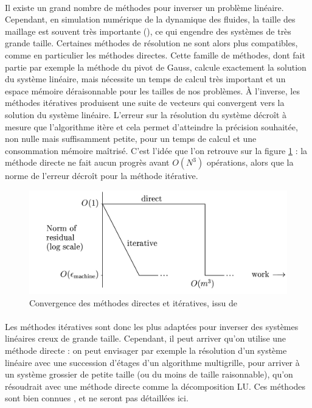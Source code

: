 		\paragraph{}
		Il existe un grand nombre de méthodes pour inverser un problème linéaire.
		Cependant, en simulation numérique de la dynamique des fluides, la taille des maillage est souvent très importante (), ce qui engendre des systèmes de très grande taille.
		Certaines méthodes de résolution ne sont alors plus compatibles, comme en particulier les méthodes directes.
		Cette famille de méthodes, dont fait partie par exemple la méthode du pivot de Gauss, calcule exactement la solution du système linéaire, mais nécessite un temps de calcul très important et un espace mémoire déraisonnable pour les tailles de nos problèmes.
		À l'inverse, les méthodes itératives produisent une suite de vecteurs qui convergent vers la solution du système linéaire.
		L'erreur sur la résolution du système décroît à mesure que l'algorithme itère et cela permet d'atteindre la précision souhaitée, non nulle mais suffisamment petite, pour un temps de calcul et une consommation mémoire maîtrisé.
		C'est l'idée que l'on retrouve sur la figure \ref{fig:direct-iterative} : la méthode directe ne fait aucun progrès avant $O\left(N^3\right)$ opérations, alors que la norme de l'erreur décroît pour la méthode itérative.

		\begin{figure}
			\centering
			\includegraphics[width=.7\textwidth]{images/direct-iterative.png}
			\caption{Convergence des méthodes directes et itératives, issu de \cite{TrefethenBau1997}}
			\label{fig:direct-iterative}
		\end{figure}

		\paragraph{}
		Les méthodes itératives sont donc les plus adaptées pour inverser des systèmes linéaires creux de grande taille.
		Cependant, il peut arriver qu'on utilise une méthode directe : on peut envisager par exemple la résolution d'un système linéaire avec une succession d'étages d'un algorithme multigrille, pour arriver à un système grossier de petite taille (ou du moins de taille raisonnable), qu'on résoudrait avec une méthode directe comme la décomposition LU.
		Ces méthodes sont bien connues \cite{TrefethenBau1997}, et ne seront pas détaillées ici.


